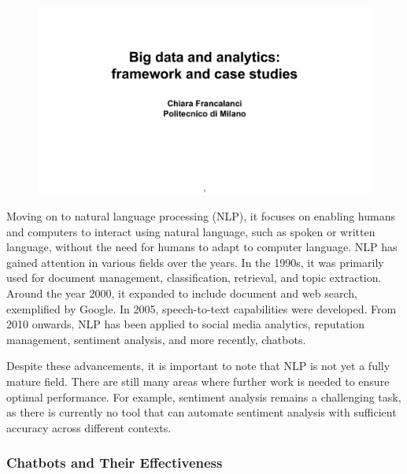 \begin{figure}[!h]
    \centering
    \includegraphics[page=11, trim = 1.5cm 5cm 1.5cm 4cm, clip, width=\textwidth]{images/06 - BIG_DATA.pdf}
\end{figure}

Moving on to natural language processing (NLP), it focuses on enabling
humans and computers to interact using natural language, such as spoken
or written language, without the need for humans to adapt to computer
language. NLP has gained attention in various fields over the years. In
the 1990s, it was primarily used for document management,
classification, retrieval, and topic extraction. Around the year 2000,
it expanded to include document and web search, exemplified by Google.
In 2005, speech-to-text capabilities were developed. From 2010 onwards,
NLP has been applied to social media analytics, reputation management,
sentiment analysis, and more recently, chatbots.

Despite these advancements, it is important to note that NLP is not yet
a fully mature field. There are still many areas where further work is
needed to ensure optimal performance. For example, sentiment analysis
remains a challenging task, as there is currently no tool that can
automate sentiment analysis with sufficient accuracy across different
contexts.


\subsubsection{Chatbots and Their
    Effectiveness}\label{chatbots-and-their-effectiveness}

